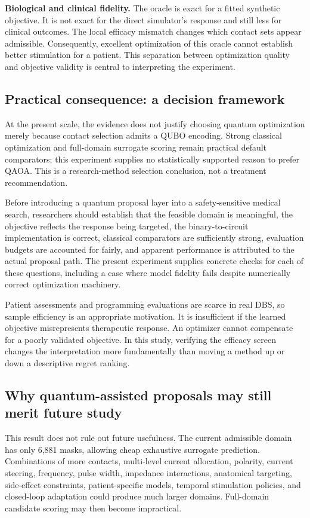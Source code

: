\documentclass[11pt,letterpaper]{article}
\begin{document}
\textbf{Biological and clinical fidelity.} The oracle is exact for a fitted synthetic objective. It is not exact for the direct simulator's response and still less for clinical outcomes. The local efficacy mismatch changes which contact sets appear admissible. Consequently, excellent optimization of this oracle cannot establish better stimulation for a patient. This separation between optimization quality and objective validity is central to interpreting the experiment.

\subsection{Practical consequence: a decision framework}
At the present scale, the evidence does not justify choosing quantum optimization merely because contact selection admits a QUBO encoding. Strong classical optimization and full-domain surrogate scoring remain practical default comparators; this experiment supplies no statistically supported reason to prefer QAOA. This is a research-method selection conclusion, not a treatment recommendation.

Before introducing a quantum proposal layer into a safety-sensitive medical search, researchers should establish that the feasible domain is meaningful, the objective reflects the response being targeted, the binary-to-circuit implementation is correct, classical comparators are sufficiently strong, evaluation budgets are accounted for fairly, and apparent performance is attributed to the actual proposal path. The present experiment supplies concrete checks for each of these questions, including a case where model fidelity fails despite numerically correct optimization machinery.

Patient assessments and programming evaluations are scarce in real DBS, so sample efficiency is an appropriate motivation. It is insufficient if the learned objective misrepresents therapeutic response. An optimizer cannot compensate for a poorly validated objective. In this study, verifying the efficacy screen changes the interpretation more fundamentally than moving a method up or down a descriptive regret ranking.

\subsection{Why quantum-assisted proposals may still merit future study}
This result does not rule out future usefulness. The current admissible domain has only 6,881 masks, allowing cheap exhaustive surrogate prediction. Combinations of more contacts, multi-level current allocation, polarity, current steering, frequency, pulse width, impedance interactions, anatomical targeting, side-effect constraints, patient-specific models, temporal stimulation policies, and closed-loop adaptation could produce much larger domains. Full-domain candidate scoring may then become impractical.
\end{document}
